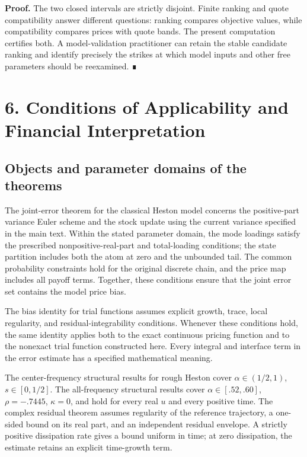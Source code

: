 \documentclass[a4paper,11pt]{article}
\begin{document}
\textbf{Proof.} The two closed intervals are strictly disjoint. Finite ranking and quote compatibility answer different questions: ranking compares objective values, while compatibility compares prices with quote bands. The present computation certifies both. A model-validation practitioner can retain the stable candidate ranking and identify precisely the strikes at which model inputs and other free parameters should be reexamined. ∎

\section*{6. Conditions of Applicability and Financial Interpretation}

\subsection*{Objects and parameter domains of the theorems}

The joint-error theorem for the classical Heston model concerns the positive-part variance Euler scheme and the stock update using the current variance specified in the main text. Within the stated parameter domain, the mode loadings satisfy the prescribed nonpositive-real-part and total-loading conditions; the state partition includes both the atom at zero and the unbounded tail. The common probability constraints hold for the original discrete chain, and the price map includes all payoff terms. Together, these conditions ensure that the joint error set contains the model price bias.

The bias identity for trial functions assumes explicit growth, trace, local regularity, and residual-integrability conditions. Whenever these conditions hold, the same identity applies both to the exact continuous pricing function and to the nonexact trial function constructed here. Every integral and interface term in the error estimate has a specified mathematical meaning.

The center-frequency structural results for rough Heston cover \(\alpha\in(1/2,1)\), \(s\in[0,1/2]\). The all-frequency structural results cover \(\alpha\in[.52,.60]\), \(\rho=-.7445\), \(\kappa=0\), and hold for every real \(u\) and every positive time. The complex residual theorem assumes regularity of the reference trajectory, a one-sided bound on its real part, and an independent residual envelope. A strictly positive dissipation rate gives a bound uniform in time; at zero dissipation, the estimate retains an explicit time-growth term.
\end{document}
